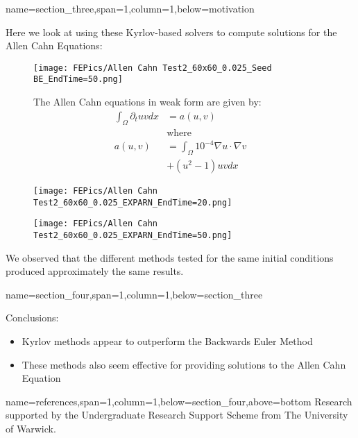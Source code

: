\documentclass[latin,a0paper,portrait]{xebaposter}
\newcommand{\reducegap}{\vspace{-4pt}}
\begin{document}
\begin{poster}
{name=section_three,span=1,column=1,below=motivation}
{
Here we look at using these Kyrlov-based solvers to compute solutions for the Allen Cahn Equations:
\begin{figure}[H]
    \centering
    \begin{minipage}{0.49\textwidth}
	    \texttt{[image: FEPics/Allen Cahn Test2\_60x60\_0.025\_Seed BE\_EndTime=50.png]}
	    \label{fig:example}
    \end{minipage}\hfill
    \begin{minipage}{0.49\textwidth}
	\begin{center}
		The Allen Cahn equations in weak form are given by:
		\begin{align*}
		\int_{\Omega} \partial_tu v dx &= a(u,v)\\
		&\text {where }\\
		a(u,v) &= \int_{\Omega} 10^{-4} \nabla u \cdot \nabla v\\
			  &+ (u^2-1)uv dx
		\end{align*}
	\end{center}
    \end{minipage}\hfill
    \begin{minipage}{0.49\textwidth}
	    \texttt{[image: FEPics/Allen Cahn Test2\_60x60\_0.025\_EXPARN\_EndTime=20.png]}
	    \label{fig:example}    
    \end{minipage}\hfill
    \begin{minipage}{0.49\textwidth}
	    \texttt{[image: FEPics/Allen Cahn Test2\_60x60\_0.025\_EXPARN\_EndTime=50.png]}
	    \label{fig:example}
    \end{minipage}
\end{figure}
We observed that the different methods tested for the same initial conditions produced approximately the same results.
}


{name=section_four,span=1,column=1,below=section_three}
{
Conclusions:
\begin{itemize}
\item Kyrlov methods appear to outperform the Backwards Euler Method
\item These methods also seem effective for providing solutions to the Allen Cahn Equation
\end{itemize}
}


{name=references,span=1,column=1,below=section_four,above=bottom}
{
\AtNextBibliography{\smaller} %
\printbibliography[heading=none]
\reducegap
\reducegap
\smaller %
Research supported by the Undergraduate Research Support Scheme from The University of Warwick.
}


\end{poster}
\end{document}
